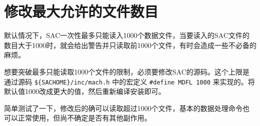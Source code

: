 \section{修改最大允许的文件数目}
\label{sec:mdfl}
默认情况下，SAC一次性最多只能读入1000个数据文件，当要读入的SAC文件的
数目大于1000时，就会给出警告并只读取前1000个文件，有时会造成一些不必备的
麻烦。

想要突破最多只能读取1000个文件的限制，必须要修改SAC的源码。这个上限是
通过源码 \verb|${SACHOME}/inc/mach.h| 中的宏定义 \verb|#define MDFL 1000|
来实现的。将默认值1000改成更大的值，然后重新编译安装即可。

简单测试了一下，修改后的确可以读取超过1000个文件，基本的数据处理命令也
可以正常使用，但尚不确定是否有其他副作用。
